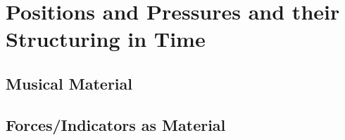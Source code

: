 \chapter{Positions and Pressures and their Structuring in Time}
\section{Musical Material}
\section{Forces/Indicators as Material}
